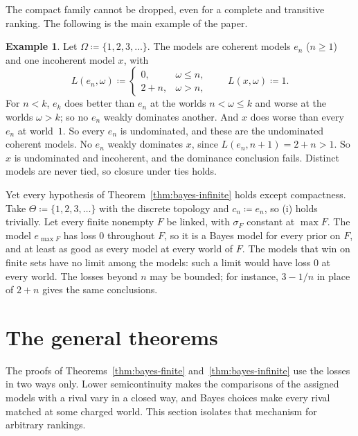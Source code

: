 \documentclass[11pt]{article}
\theoremstyle{definition}
\newtheorem{example}[theorem]{Example}
\theoremstyle{remark}
\begin{document}
The compact family cannot be dropped, even for a complete and transitive ranking. The following is the main example of the paper.

\begin{example}\label{ex:main}
Let $\Omega\coloneqq\{1,2,3,\dots\}$. The models are coherent models $e_n$ ($n\ge1$) and one incoherent model $x$, with
\[
L(e_n,\omega)\coloneqq\begin{cases}0,&\omega\le n,\\ 2+n,&\omega>n,\end{cases}\qquad L(x,\omega)\coloneqq1.
\]
For $n<k$, $e_k$ does better than $e_n$ at the worlds $n<\omega\le k$ and worse at the worlds $\omega>k$; so no $e_n$ weakly dominates another. And $x$ does worse than every $e_n$ at world~$1$. So every $e_n$ is undominated, and these are the undominated coherent models. No $e_n$ weakly dominates $x$, since $L(e_n,n+1)=2+n>1$. So $x$ is undominated and incoherent, and the dominance conclusion fails. Distinct models are never tied, so closure under ties holds.

Yet every hypothesis of Theorem~\ref{thm:bayes-infinite} holds except compactness. Take $\Theta\coloneqq\{1,2,3,\dots\}$ with the discrete topology and $c_n\coloneqq e_n$, so (i) holds trivially. Let every finite nonempty $F$ be linked, with $\sigma_F$ constant at $\max F$. The model $e_{\max F}$ has loss $0$ throughout $F$, so it is a Bayes model for every prior on $F$, and at least as good as every model at every world of $F$. The models that win on finite sets have no limit among the models: such a limit would have loss $0$ at every world. The losses beyond $n$ may be bounded; for instance, $3-1/n$ in place of $2+n$ gives the same conclusions.
\end{example}

\section{The general theorems}\label{sec:general}

The proofs of Theorems~\ref{thm:bayes-finite} and~\ref{thm:bayes-infinite} use the losses in two ways only. Lower semicontinuity makes the comparisons of the assigned models with a rival vary in a closed way, and Bayes choices make every rival matched at some charged world. This section isolates that mechanism for arbitrary rankings.
\end{document}
